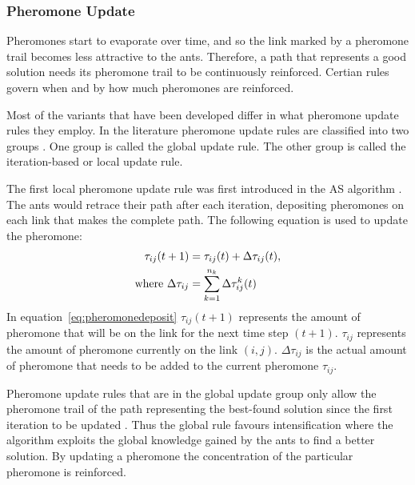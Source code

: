 \subsubsection{Pheromone Update}
Pheromones start to evaporate over time, and so the link marked by a pheromone trail becomes less attractive to the ants. Therefore, a path that represents a good solution needs its pheromone trail to be continuously reinforced. Certian rules govern when and by how much pheromones are reinforced.

 Most of the variants that have been developed differ in what pheromone update rules they employ. In the literature pheromone update rules are classified into two groups \cite{CompuIntelligenceIntro}. One group is called the global update rule. The other group is called the iteration-based or local update rule\cite{CompuIntelligenceIntro}. 

The first local pheromone update rule was first introduced in the \gls{AS} algorithm \cite{CompuIntelligenceIntro,AntSurvey,AntsAndStigmergy}. The ants would retrace their path after each iteration, depositing pheromones on each link that makes the complete path. The following equation is used to update the pheromone:
\begin{align}
\label{eq:pheromonedeposit}
 \tau_{ij}(t+1) &= \tau_{ij}(t) + \Delta\tau_{ij}(t),\\ 
 \text{where }\Delta\tau_{ij} &= \sum^{n_k}_{k=1}\Delta\tau^k_{ij}(t) \notag
\end{align}
In equation~\ref{eq:pheromonedeposit} $\tau_{ij}(t+1)$ represents the amount of pheromone that will be on the link for the next time step $(t+1)$. $\tau_{ij}$ represents the amount of pheromone currently on the link $(i,j)$. $\Delta\tau_{ij}$ is the actual amount of pheromone that needs to be added to the current pheromone $\tau_{ij}$.

Pheromone update rules that are in the global update group only allow the pheromone trail of the path representing the best-found solution since the first iteration to be updated \cite{CompuIntelligenceIntro}. Thus the global rule favours intensification where the algorithm exploits the global knowledge gained by the ants to find a better solution. By updating a pheromone the concentration of the particular pheromone is reinforced.

